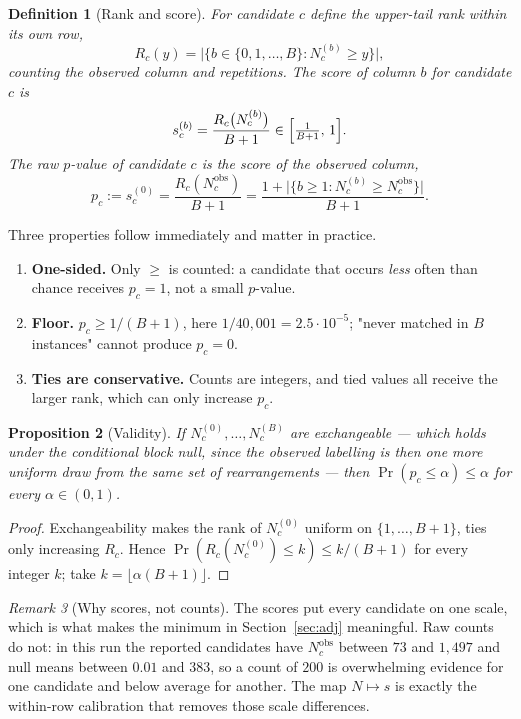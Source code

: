 \documentclass[11pt,a4paper]{article}
\newtheorem{definition}{Definition}[section]
\newtheorem{proposition}[definition]{Proposition}
\theoremstyle{remark}
\newtheorem{remark}[definition]{Remark}
\newcommand{\obs}{\mathrm{obs}}
\begin{document}
\begin{definition}[Rank and score]
\label{def:score}
For candidate $c$ define the upper-tail rank within its own row,
\[
  R_c(y)=\bigl|\{b\in\{0,1,\dots,B\}: N_c^{(b)}\ge y\}\bigr|,
\]
counting the observed column and repetitions. The \emph{score} of column $b$
for candidate $c$ is
\[
  s_c^{(b)}=\frac{R_c\bigl(N_c^{(b)}\bigr)}{B+1}\in\Bigl[\tfrac1{B+1},\,1\Bigr].
\]
The \emph{raw $p$-value} of candidate $c$ is the score of the observed column,
\[
  p_c:=s_c^{(0)}=\frac{R_c(N_c^{\obs})}{B+1}
     =\frac{1+\bigl|\{b\ge1: N_c^{(b)}\ge N_c^{\obs}\}\bigr|}{B+1}.
\]
\end{definition}

Three properties follow immediately and matter in practice.

\begin{enumerate}[itemsep=3pt]
  \item \textbf{One-sided.} Only $\ge$ is counted: a candidate that occurs
    \emph{less} often than chance receives $p_c=1$, not a small $p$-value.
  \item \textbf{Floor.} $p_c\ge 1/(B+1)$, here $1/40{,}001=2.5\cdot10^{-5}$;
    "never matched in $B$ instances" cannot produce $p_c=0$.
  \item \textbf{Ties are conservative.} Counts are integers, and tied values
    all receive the larger rank, which can only increase $p_c$.
\end{enumerate}

\begin{proposition}[Validity]
\label{prop:valid}
If $N_c^{(0)},\dots,N_c^{(B)}$ are exchangeable --- which holds under the
conditional block null, since the observed labelling is then one more uniform
draw from the same set of rearrangements --- then
$\Pr(p_c\le\alpha)\le\alpha$ for every $\alpha\in(0,1)$.
\end{proposition}

\begin{proof}
Exchangeability makes the rank of $N_c^{(0)}$ uniform on $\{1,\dots,B+1\}$,
ties only increasing $R_c$. Hence $\Pr(R_c(N_c^{(0)})\le k)\le k/(B+1)$ for
every integer $k$; take $k=\lfloor\alpha(B+1)\rfloor$.
\end{proof}

\begin{remark}[Why scores, not counts]
\label{rem:scale}
The scores put every candidate on one scale, which is what makes the minimum in
Section~\ref{sec:adj} meaningful. Raw counts do not: in this run the reported
candidates have $N_c^{\obs}$ between $73$ and $1{,}497$ and null means between
$0.01$ and $383$, so a count of $200$ is overwhelming evidence for one
candidate and below average for another. The map $N\mapsto s$ is exactly the
within-row calibration that removes those scale differences.
\end{remark}
\end{document}
